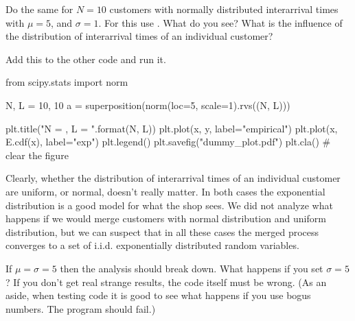 \documentclass{scrartcl}
\begin{document}
\begin{exercise}
  Do the same for $N=10$ customers with normally distributed interarrival times with $\mu=5$, and $\sigma =1$.
For this use . What do you see? What is the influence of the distribution of interarrival times of an individual customer? 
\begin{solution}
Add this to the other code and run it. 
\begin{pyverbatim}
from scipy.stats import norm

N, L = 10, 10
a = superposition(norm(loc=5, scale=1).rvs((N, L)))

plt.title("N = {}, L = {}".format(N, L))
plt.plot(x, y,  label="empirical")
plt.plot(x, E.cdf(x),  label="exp")
plt.legend()
plt.savefig("dummy_plot.pdf")
plt.cla() # clear the figure
\end{pyverbatim}

Clearly, whether the distribution of interarrival times of an individual customer are uniform, or normal, doesn't really matter. In both cases the exponential distribution is a good model for what the shop sees. We did not analyze what happens if we would merge customers with normal distribution and uniform distribution, but we can suspect that in all these cases the merged process converges to a set of i.i.d. exponentially distributed random variables.

\end{solution}
\end{exercise}

\begin{exercise}
If  $\mu=\sigma=5$ then the analysis should break down. What happens if you set $\sigma=5$? If you don't get real strange results, the code itself must be wrong. (As an aside, when testing code it is good to see what happens if you use bogus numbers. The program should fail.)
\end{exercise}
\end{document}

